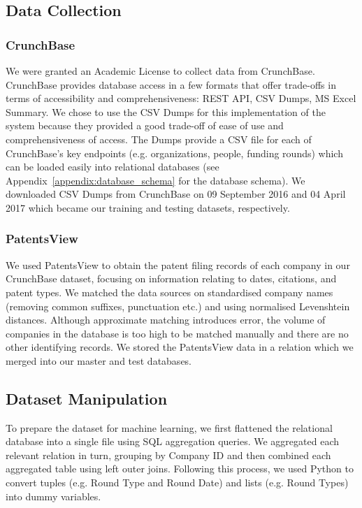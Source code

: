 \documentclass[../thesis/thesis.tex]{subfiles}
\begin{document}

\subsection{Data Collection}

\subsubsection{CrunchBase}

We were granted an Academic License to collect data from CrunchBase. CrunchBase provides database access in a few formats that offer trade-offs in terms of accessibility and comprehensiveness: REST API, CSV Dumps, MS Excel Summary. We chose to use the CSV Dumps for this implementation of the system because they provided a good trade-off of ease of use and comprehensiveness of access. The Dumps provide a CSV file for each of CrunchBase's key endpoints (e.g. organizations, people, funding rounds) which can be loaded easily into relational databases (see Appendix~\ref{appendix:database_schema} for the database schema). We downloaded CSV Dumps from CrunchBase on 09 September 2016 and 04 April 2017 which became our training and testing datasets, respectively.

\subsubsection{PatentsView}

We used PatentsView to obtain the patent filing records of each company in our CrunchBase dataset, focusing on information relating to dates, citations, and patent types. We matched the data sources on standardised company names (removing common suffixes, punctuation etc.) and using normalised Levenshtein distances. Although approximate matching introduces error, the volume of companies in the database is too high to be matched manually and there are no other identifying records. We stored the PatentsView data in a relation which we merged into our master and test databases.

\subsection{Dataset Manipulation}

To prepare the dataset for machine learning, we first flattened the relational database into a single file using SQL aggregation queries. We aggregated each relevant relation in turn, grouping by Company ID and then combined each aggregated table using left outer joins. Following this process, we used Python to convert tuples (e.g. Round Type and Round Date) and lists (e.g. Round Types) into dummy variables.
\end{document}
